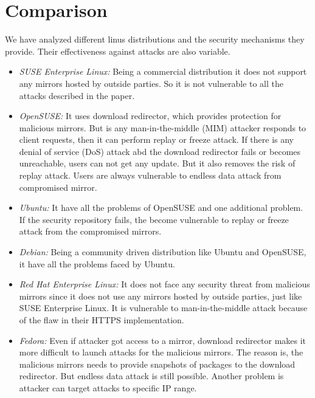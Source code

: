 \documentclass{IEEEtran}
\begin{document}
\section{Comparison}
\label{sec:comparison}
We have analyzed different linus distributions and the security mechanisms they provide. Their effectiveness against attacks are also variable.

\begin{itemize}
	\item \emph{SUSE Enterprise Linux:} Being a commercial distribution it does not support any mirrors hosted by outside parties. So it is not vulnerable to all the attacks described in the paper.
	\item \emph{OpenSUSE:} It uses download redirector, which provides protection for malicious mirrors. But is any man-in-the-middle (MIM) attacker responds to client requests, then it can perform replay or freeze attack. If there is any denial of service (DoS) attack abd the download redirector fails or becomes unreachable, users can not get any update. But it also removes the risk of replay attack. Users are always vulnerable to endless data attack from compromised mirror.
	\item \emph{Ubuntu:} It have all the problems of OpenSUSE and one additional problem. If the security repository fails, the become vulnerable to replay or freeze attack from the compromised mirrors.
	\item \emph{Debian:} Being a community driven distribution like Ubuntu and OpenSUSE, it have all the problems faced by Ubuntu.
	\item \emph{Red Hat Enterprise Linux:} It does not face any security threat from malicious mirrors since it does not use any mirrors hosted by outside parties, just like SUSE Enterprise Linux. It is vulnerable to man-in-the-middle attack because of the flaw in their HTTPS implementation.
	\item \emph{Fedora:} Even if attacker got access to a mirror, download redirector makes it more difficult to launch attacks for the malicious mirrors. The reason is, the malicious mirrors needs to provide snapshots of packages to the download redirector. But endless data attack is still possible. Another problem is attacker can target attacks to specific IP range.
	
\end{itemize}
\end{document}
